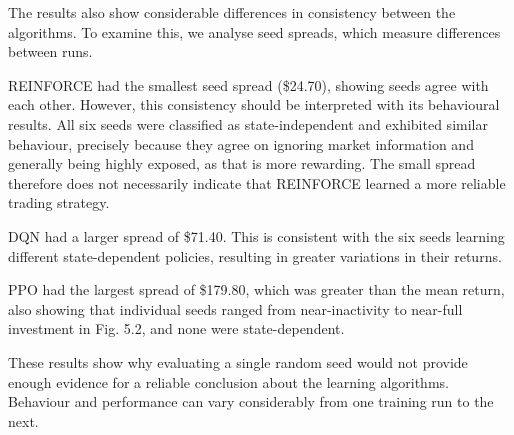 The results also show considerable differences in consistency between
the algorithms. To examine this, we analyse seed spreads, which measure
differences between runs.

REINFORCE had the smallest seed spread (\$24.70), showing seeds agree
with each other. However, this consistency should be interpreted with
its behavioural results. All six seeds were classified as
state-independent and exhibited similar behaviour, precisely because
they agree on ignoring market information and generally being highly
exposed, as that is more rewarding. The small spread therefore does not
necessarily indicate that REINFORCE learned a more reliable trading
strategy.

DQN had a larger spread of \$71.40. This is consistent with the six
seeds learning different state-dependent policies, resulting in greater
variations in their returns.

PPO had the largest spread of \$179.80, which was greater than the mean
return, also showing that individual seeds ranged from near-inactivity
to near-full investment in Fig. 5.2, and none were state-dependent.

These results show why evaluating a single random seed would not provide
enough evidence for a reliable conclusion about the learning algorithms.
Behaviour and performance can vary considerably from one training run to
the next.
